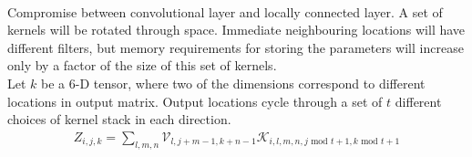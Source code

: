 \begin{remark} \\
Compromise between convolutional layer and locally connected layer. A set of kernels will be rotated through space. Immediate neighbouring locations will have different filters, but memory requirements for storing the parameters will increase only by a factor of the size of this set of kernels.\\
Let $k$ be a $6$-D tensor, where two of the dimensions correspond to different locations in output matrix. Output locations cycle through a set of $t$ different choices of kernel stack in each direction.
\begin{align*}
Z_{i,j,k} = \sum\limits_{l,m,n} \mathcal{V}_{l, j+m-1, k+n-1} \mathcal{K}_{i,l,m,n, j \text{ mod } t + 1, k \text{ mod } t + 1} \nonumber
\end{align*}  
\end{remark}

